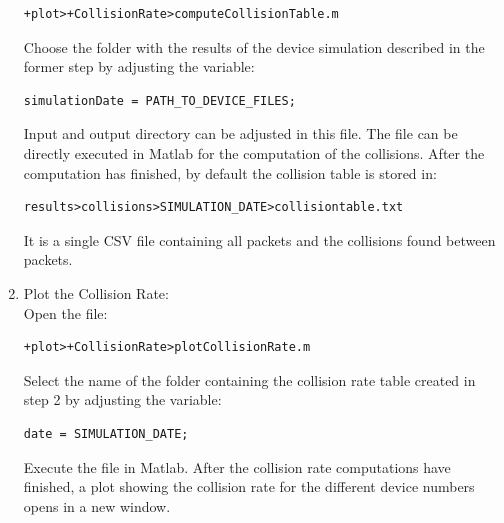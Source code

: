 \documentclass{article}
\begin{document}
\begin{appendices}
\begin{enumerate}
\begin{verbatim}
+plot>+CollisionRate>computeCollisionTable.m
\end{verbatim}
                        
                        Choose the folder with the results of the device
                        simulation described in the former step by adjusting
                        the variable:

\begin{verbatim}
simulationDate = PATH_TO_DEVICE_FILES;
\end{verbatim}
                        
                        Input and output directory can be adjusted in this
                        file. The file can be directly executed in Matlab for
                        the computation of the collisions. After the
                        computation has finished, by default the collision
                        table is stored in:
                        
\begin{verbatim}
results>collisions>SIMULATION_DATE>collisiontable.txt
\end{verbatim}

                        It is a single CSV file containing all packets and the
                        collisions found between packets.
            \item Plot the Collision Rate:\\
                    Open the file:
\begin{verbatim}
+plot>+CollisionRate>plotCollisionRate.m
\end{verbatim}
                    
                    Select the name of the folder containing the collision rate
                    table created in step 2 by adjusting the variable:

\begin{verbatim}
date = SIMULATION_DATE;
\end{verbatim}
                    Execute the file in Matlab. After the collision rate
                    computations have finished, a plot showing the collision
                    rate for the different device numbers opens in a new
                    window.
                    
        \end{enumerate}

\end{appendices}

\newpage


\end{document}

